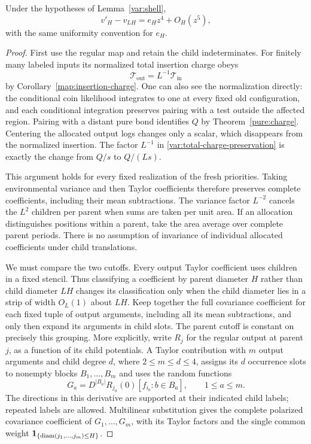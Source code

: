 \begin{lemma}\label{var:compatibility}
Under the hypotheses of Lemma~\ref{var:shell},
\begin{equation}
 v'_H-v_{LH}=e_Hz^4+O_H(z^5),
 \label{var:compatibility-bound}
\end{equation}
with the same uniformity convention for $e_H$.
\end{lemma}
\begin{proof}
First use the regular map and retain the child indeterminates.  For
finitely many labeled inputs its normalized total insertion charge
obeys
\begin{equation}
 \mathcal T_{\mathrm{out}}=L^{-1}\mathcal T_{\mathrm{in}}
 \label{var:total-charge-preservation}
\end{equation}
by Corollary~\ref{map:insertion-charge}.  One can also see the normalization
directly: the conditional coin likelihood integrates to one at every
fixed old configuration, and each conditional integration preserves
pairing with a test outside the affected region.  Pairing with a distant
pure bond identifies $Q$ by Theorem~\ref{pure:charge}.  Centering
the allocated output logs changes only a scalar, which disappears from
the normalized insertion.  The factor $L^{-1}$ in
\eqref{var:total-charge-preservation} is exactly the change from $Q/s$
to $Q/(Ls)$.

This argument holds for every fixed realization of the fresh priorities.
Taking environmental variance and then Taylor coefficients therefore
preserves complete coefficients, including their mean subtractions.
The variance factor $L^{-2}$ cancels the $L^2$ children per parent
when sums are taken per unit area.  If an allocation distinguishes
positions within a parent, take the area average over complete parent
periods.  There is no assumption of invariance of individual allocated
coefficients under child translations.

We must compare the two cutoffs.  Every output Taylor coefficient uses
children in a fixed stencil.  Thus classifying a coefficient by parent
diameter $H$ rather than child diameter $LH$ changes its classification
only when the child diameter lies in a strip of width $O_L(1)$ about
$LH$.  Keep together the full covariance coefficient for each fixed
tuple of output arguments, including all its mean subtractions, and
only then expand its arguments in child slots.  The parent cutoff
is constant on precisely this grouping.  More explicitly, write
$R_j$ for the regular output at parent $j$, as a function of its
child potentials.  A Taylor contribution with $m$ output arguments
and child degree $d$, where $2\le m\le d\le4$, assigns its $d$
occurrence slots to nonempty blocks $B_1,\ldots,B_m$ and
uses the random functions
\begin{equation}
 G_a=D^{|B_a|}R_{j_a}(0)
        [f_{i_b}:b\in B_a],\qquad 1\le a\le m.
 \label{var:taylor-blocks}
\end{equation}
The directions in this derivative are supported at their indicated
child labels; repeated labels are allowed.  Multilinear substitution
gives the complete polarized covariance coefficient of
$G_1,\ldots,G_m$, with its Taylor factors and the single common
weight $\mathbf 1_{\{\operatorname{diam}(j_1,\ldots,j_m)\le H\}}$.


\end{proof}
